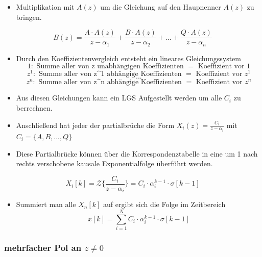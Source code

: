 \documentclass[11pt]{article}
\providecommand{\tightlist}{%
      \setlength{\itemsep}{0pt}\setlength{\parskip}{0pt}}
\begin{document}
    \begin{itemize}
\tightlist
\item
  Multiplikation mit \(A(z)\) um die Gleichung auf den Haupnenner
  \(A(z)\) zu bringen.
\end{itemize}

\[ B(z) = \frac{A\cdot A(z)}{z-\alpha_1} + \frac{B\cdot A(z)}{z-\alpha_2} + ... + \frac{Q\cdot A(z)}{z-\alpha_n}\]

    \begin{itemize}
\tightlist
\item
  Durch den Koeffizientenvergleich entsteht ein lineares
  Gleichungssystem \[
  1   : \textrm{ Summe aller von z unabhängigen Koeffizienten } = \textrm{ Koeffizient vor 1}
  \] \[
  z^1 : \textrm{ Summe aller von z^1 abhängige Koeffizienten }  = \textrm{ Koeffizient vor } z^1
  \] \[
  ...
  \] \[
  z^n : \textrm{ Summe aller von z^n abhängige Koeffizienten }  = \textrm{ Koeffizient vor } z^n
  \]
\end{itemize}

    \begin{itemize}
\tightlist
\item
  Aus diesen Gleichungen kann ein LGS Aufgestellt werden um alle \(C_i\)
  zu berrechnen.
\end{itemize}

    \begin{itemize}
\tightlist
\item
  Anschließend hat jeder der partialbrüche die Form
  \(X_i(z) = \frac{C_i}{z-\alpha_i}\) mit \(C_i = \{A, B, ..., Q\}\)
\end{itemize}

    \begin{itemize}
\tightlist
\item
  Diese Partialbrücke können über die Korrespondenztabelle in eine um 1
  nach rechts verschobene kausale Exponentialfolge überführt werden.
\end{itemize}

\[X_i[k] = \mathcal{Z}\big\{\frac{C_i}{z-\alpha_i}\big\} = C_i \cdot \alpha_i^{k-1} \cdot \sigma[k-1]\]

    \begin{itemize}
\tightlist
\item
  Summiert man alle \(X_n[k]\) auf ergibt sich die Folge im Zeitbereich
  \[x[k] = \sum_{i=1}^N C_i \cdot \alpha_i^{k-1} \cdot \sigma[k-1]\]
\end{itemize}

    \subsubsection{\texorpdfstring{mehrfacher Pol an
\(z \neq 0\)}{mehrfacher Pol an z \textbackslash{}neq 0}}\label{mehrfacher-pol-an-z-neq-0}
\end{document}
